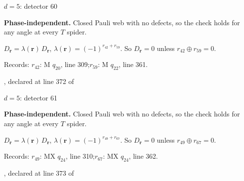 \label{d5_det060}
{\Large $d=5$: detector 60}\par
\textbf{Phase-independent.} Closed Pauli web with no defects, so the check holds for any angle at every $T$ spider.
\begin{center}
\end{center}
\vspace{-1mm}
$D_{\boldsymbol r}=\lambda(\boldsymbol r)\,D_{\boldsymbol r}$, \quad $\lambda(\boldsymbol r)=(-1)^{r_{42}+r_{59}}$. \qquad So $D_{\boldsymbol r}=0$ unless $r_{42}\oplus r_{59}=0$.
\par\smallskip\begin{minipage}{.98\linewidth}\small Records: $r_{42}$: M $q_{20}$, line 309;\quad $r_{59}$: M $q_{22}$, line 361.\end{minipage}
\vfill
{\footnotesize\texttt{}, declared at line 372 of \texttt{}}
\newpage

\label{d5_det061}
{\Large $d=5$: detector 61}\par
\textbf{Phase-independent.} Closed Pauli web with no defects, so the check holds for any angle at every $T$ spider.
\begin{center}
\end{center}
\vspace{-1mm}
$D_{\boldsymbol r}=\lambda(\boldsymbol r)\,D_{\boldsymbol r}$, \quad $\lambda(\boldsymbol r)=(-1)^{r_{49}+r_{67}}$. \qquad So $D_{\boldsymbol r}=0$ unless $r_{49}\oplus r_{67}=0$.
\par\smallskip\begin{minipage}{.98\linewidth}\small Records: $r_{49}$: MX $q_{24}$, line 310;\quad $r_{67}$: MX $q_{24}$, line 362.\end{minipage}
\vfill
{\footnotesize\texttt{}, declared at line 373 of \texttt{}}
\newpage

